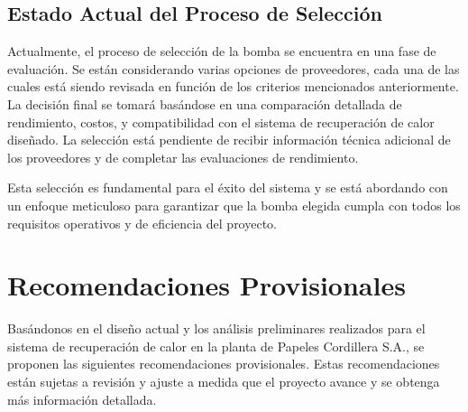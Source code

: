 \documentclass[11pt,a4paper]{article}  %
\begin{document}
\subsection{Estado Actual del Proceso de Selección}
Actualmente, el proceso de selección de la bomba se encuentra en una fase de evaluación. Se están considerando varias opciones de proveedores, cada una de las cuales está siendo revisada en función de los criterios mencionados anteriormente. La decisión final se tomará basándose en una comparación detallada de rendimiento, costos, y compatibilidad con el sistema de recuperación de calor diseñado. La selección está pendiente de recibir información técnica adicional de los proveedores y de completar las evaluaciones de rendimiento.

Esta selección es fundamental para el éxito del sistema y se está abordando con un enfoque meticuloso para garantizar que la bomba elegida cumpla con todos los requisitos operativos y de eficiencia del proyecto.

\section{Recomendaciones Provisionales}

Basándonos en el diseño actual y los análisis preliminares realizados para el sistema de recuperación de calor en la planta de Papeles Cordillera S.A., se proponen las siguientes recomendaciones provisionales. Estas recomendaciones están sujetas a revisión y ajuste a medida que el proyecto avance y se obtenga más información detallada.
\end{document}
